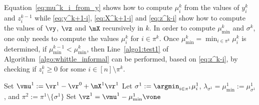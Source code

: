 Equation~\eqref{eq:mu^k_i_from_y} shows how to compute $\mu^k_i$ from the values of $y^{k}_i$ and $z^{k-1}_i$ while \eqref{eq:y^k+1-i}, \eqref{eq:X^k+1-i} and \eqref{eq:z^k-i} show how to compute the values of $\vy$, $\vz$ and $\mX$ recursively in $k$. In order to compute $\mu^k_{\min}$ and $\sigma^k$, one only needs to compute the values $\mu^k_i$ for $i\in\pi^{k}$.  Once $\mu^k_{\min}=\min_{i\in\pi^k}\mu^k_i$ is determined, if $\mu^{k-1}_{\min} <\mu^k_{\min}$, then Line~\ref{algo1:test1} of Algorithm~\ref{algo:whittle_informal} can be performed, based on \eqref{eq:z^k-i}, by checking if $z^{k}_i \ge 0$ for some $i\in[n]\setminus\pi^{k}$.

\begin{algorithm}[hbtp]
    \DontPrintSemicolon
    \SetAlgoLined
    \BlankLine
    Set $\vmu^1:=\vr^1-\vr^0 +\mX^1\vr^{1}$ \;
    Let $\sigma^1:=\argmin_{i\in\pi^1}\mu_i^1$, $\lambda_{\sigma^1} = \mu^1_{\min} := \mu^1_{\sigma^1}$, and $\pi^{2} := \pi^{1}\setminus\{\sigma^{1}\}$ \;\label{line:def_mu1}
    Set $\vz^1=\vmu^1 -\mu^1_{\min}\vone$ \;\label{algo2:init_end}
\end{algorithm}
